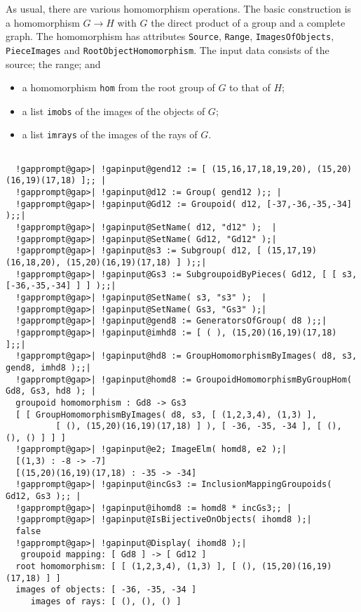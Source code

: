 \documentclass[a4paper,11pt]{report}
\begin{document}
{{{ As usual, there are various homomorphism operations. The basic construction is
a homomorphism $G \to H$ with $G$ the direct product of a group and a complete graph. The homomorphism has
attributes \texttt{Source}, \texttt{Range}, \texttt{ImagesOfObjects}, \texttt{PieceImages} and \texttt{RootObjectHomomorphism}. The input data consists of the source; the range; and 
\begin{itemize}
\item  a homomorphism \texttt{hom} from the root group of $G$ to that of $H$; 
\item  a list \texttt{imobs} of the images of the objects of $G$; 
\item  a list \texttt{imrays} of the images of the rays of $G$. 
\end{itemize}
 

 }

 
\begin{Verbatim}[commandchars=!@|,fontsize=\small,frame=single,label=Example]
  
  !gapprompt@gap>| !gapinput@gend12 := [ (15,16,17,18,19,20), (15,20)(16,19)(17,18) ];; |
  !gapprompt@gap>| !gapinput@d12 := Group( gend12 );; |
  !gapprompt@gap>| !gapinput@Gd12 := Groupoid( d12, [-37,-36,-35,-34] );;|
  !gapprompt@gap>| !gapinput@SetName( d12, "d12" );  |
  !gapprompt@gap>| !gapinput@SetName( Gd12, "Gd12" );|
  !gapprompt@gap>| !gapinput@s3 := Subgroup( d12, [ (15,17,19)(16,18,20), (15,20)(16,19)(17,18) ] );;|
  !gapprompt@gap>| !gapinput@Gs3 := SubgroupoidByPieces( Gd12, [ [ s3, [-36,-35,-34] ] ] );;|
  !gapprompt@gap>| !gapinput@SetName( s3, "s3" );  |
  !gapprompt@gap>| !gapinput@SetName( Gs3, "Gs3" );|
  !gapprompt@gap>| !gapinput@gend8 := GeneratorsOfGroup( d8 );;|
  !gapprompt@gap>| !gapinput@imhd8 := [ ( ), (15,20)(16,19)(17,18) ];;|
  !gapprompt@gap>| !gapinput@hd8 := GroupHomomorphismByImages( d8, s3, gend8, imhd8 );;|
  !gapprompt@gap>| !gapinput@homd8 := GroupoidHomomorphismByGroupHom( Gd8, Gs3, hd8 ); |
  groupoid homomorphism : Gd8 -> Gs3
  [ [ GroupHomomorphismByImages( d8, s3, [ (1,2,3,4), (1,3) ], 
          [ (), (15,20)(16,19)(17,18) ] ), [ -36, -35, -34 ], [ (), (), () ] ] ]
  !gapprompt@gap>| !gapinput@e2; ImageElm( homd8, e2 );|
  [(1,3) : -8 -> -7]
  [(15,20)(16,19)(17,18) : -35 -> -34]
  !gapprompt@gap>| !gapinput@incGs3 := InclusionMappingGroupoids( Gd12, Gs3 );; |
  !gapprompt@gap>| !gapinput@ihomd8 := homd8 * incGs3;; |
  !gapprompt@gap>| !gapinput@IsBijectiveOnObjects( ihomd8 );|
  false
  !gapprompt@gap>| !gapinput@Display( ihomd8 );|
   groupoid mapping: [ Gd8 ] -> [ Gd12 ]
  root homomorphism: [ [ (1,2,3,4), (1,3) ], [ (), (15,20)(16,19)(17,18) ] ]
  images of objects: [ -36, -35, -34 ]
     images of rays: [ (), (), () ]
  

\end{Verbatim}}}
\end{document}
